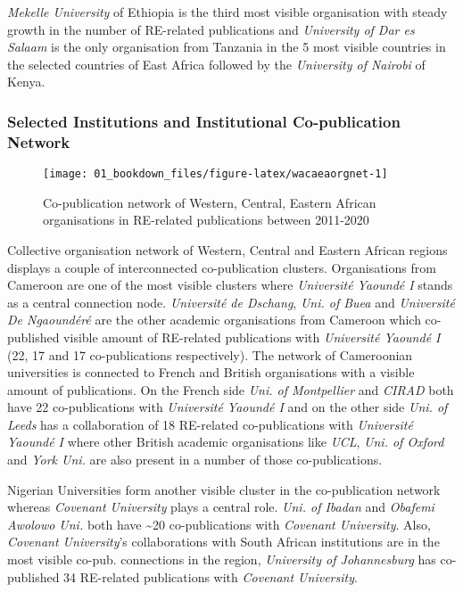 \documentclass[12pt,twoside]{report}
\begin{document}
\emph{Mekelle University} of Ethiopia is the third most visible organisation with steady growth in the number of RE-related publications and \emph{University of Dar es Salaam} is the only organisation from Tanzania in the 5 most visible countries in the selected countries of East Africa followed by the \emph{University of Nairobi} of Kenya.

\hypertarget{selected-institutions-and-institutional-co-publication-network}{%
\subsubsection{Selected Institutions and Institutional Co-publication Network}\label{selected-institutions-and-institutional-co-publication-network}}

\begin{figure}
\texttt{[image: 01\_bookdown\_files/figure-latex/wacaeaorgnet-1]} \caption{Co-publication network of Western, Central, Eastern African organisations in RE-related publications between 2011-2020}\label{fig:wacaeaorgnet}
\end{figure}

Collective organisation network of Western, Central and Eastern African regions displays a couple of interconnected co-publication clusters. Organisations from Cameroon are one of the most visible clusters where \emph{Université Yaoundé I} stands as a central connection node. \emph{Université de Dschang}, \emph{Uni. of Buea} and \emph{Université De Ngaoundéré} are the other academic organisations from Cameroon which co-published visible amount of RE-related publications with \emph{Université Yaoundé I} (22, 17 and 17 co-publications respectively). The network of Cameroonian universities is connected to French and British organisations with a visible amount of publications. On the French side \emph{Uni. of Montpellier} and \emph{CIRAD} both have 22 co-publications with \emph{Université Yaoundé I} and on the other side \emph{Uni. of Leeds} has a collaboration of 18 RE-related co-publications with \emph{Université Yaoundé I} where other British academic organisations like \emph{UCL}, \emph{Uni. of Oxford} and \emph{York Uni.} are also present in a number of those co-publications.

Nigerian Universities form another visible cluster in the co-publication network whereas \emph{Covenant University} plays a central role. \emph{Uni. of Ibadan} and \emph{Obafemi Awolowo Uni.} both have \textasciitilde20 co-publications with \emph{Covenant University}. Also, \emph{Covenant University}'s collaborations with South African institutions are in the most visible co-pub. connections in the region, \emph{University of Johannesburg} has co-published 34 RE-related publications with \emph{Covenant University}.
\end{document}
